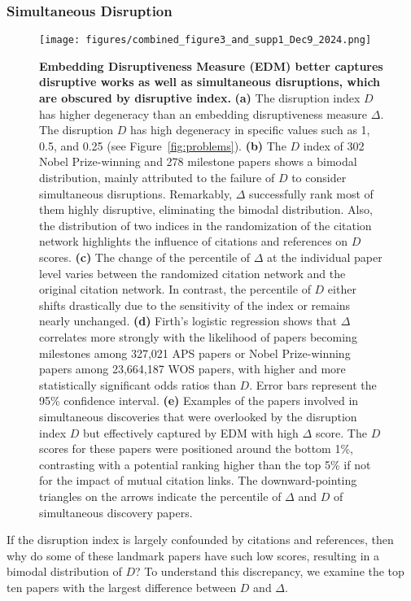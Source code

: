 \documentclass[12pt]{article}
\begin{document}
\subsubsection{Simultaneous Disruption}
\label{sec:result_simdis}
\begin{figure}
    \centering
    \texttt{[image: figures/combined\_figure3\_and\_supp1\_Dec9\_2024.png]}
    \caption{\textbf{Embedding Disruptiveness Measure (EDM) better captures disruptive works as well as simultaneous disruptions, which are obscured by disruptive index.} \textbf{(a)}
    The disruption index $D$ has higher degeneracy than an embedding disruptiveness measure $\Delta$. The disruption $D$ has high degeneracy in specific values such as 1, 0.5, and 0.25 (see Figure~\ref{fig:problems}). \textbf{(b)} The $D$ index of 302 Nobel Prize-winning and 278 milestone papers shows a bimodal distribution, mainly attributed to the failure of $D$ to consider simultaneous disruptions. Remarkably, $\Delta$ successfully rank most of them highly disruptive, eliminating the bimodal distribution. Also, the distribution of two indices in the randomization of the citation network highlights the influence of citations and references on $D$ scores. \textbf{(c)} The change of the percentile of $\Delta$ at the individual paper level varies between the randomized citation network and the original citation network. In contrast, the percentile of $D$ either shifts drastically due to the sensitivity of the index or remains nearly unchanged. \textbf{(d)} Firth's logistic regression shows that $\Delta$ correlates more strongly with the likelihood of papers becoming milestones among 327,021 APS papers or Nobel Prize-winning papers among 23,664,187 WOS papers, with higher and more statistically significant odds ratios than $D$. Error bars represent the 95\% confidence interval. \textbf{(e)} Examples of the papers involved in simultaneous discoveries that were overlooked by the disruption index $D$ but effectively captured by EDM with high $\Delta$ score. The $D$ scores for these papers were positioned around the bottom 1\%, contrasting with a potential ranking higher than the top 5\% if not for the impact of mutual citation links. The downward-pointing triangles on the arrows indicate the percentile of $\Delta$ and $D$ of simultaneous discovery papers.} 
    \label{fig:distribution_disruption}
\end{figure}



If the disruption index is largely confounded by citations and references, then why do some of these landmark papers have such low scores, resulting in a bimodal distribution of $D$? To understand this discrepancy, we examine the top ten papers with the largest difference between $D$ and $\Delta$.
\end{document}
